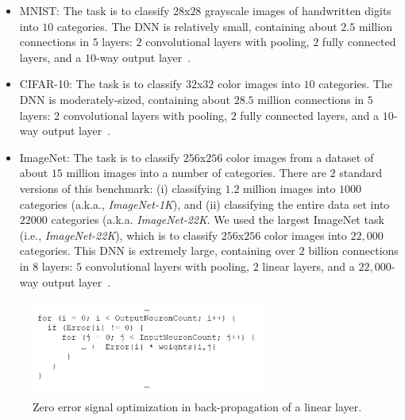 \begin{itemize}
\item MNIST: The task is to classify $28$x$28$ grayscale images of handwritten digits into $10$ categories. The DNN is relatively small, containing about $2.5$ million connections in $5$ layers: $2$ convolutional layers with pooling, $2$ fully connected layers, and a $10$-way output layer~\cite{Chilimbi14}.

\item CIFAR-10: The task is to classify $32$x$32$ color images into $10$ categories.  The DNN is moderately-sized, containing about $28.5$ million connections in $5$  layers: $2$ convolutional layers with pooling, $2$ fully connected layers, and a $10$-way output layer~\cite{Krizhevsky12}.

\item ImageNet:  The task is to classify $256$x$256$ color images from  a dataset of about $15$ million images into a number of categories.  There are $2$ standard versions of this benchmark: (i) classifying $1.2$ million images into $1000$ categories (a.k.a., {\it ImageNet-1K}), and (ii) classifying the entire data set into $22000$ categories (a.k.a. {\it ImageNet-22K}. We used the largest ImageNet task (i.e., {\it ImageNet-22K}), which is to classify $256$x$256$ color images into $22,000$ categories.  This DNN is extremely large, containing over $2$ billion connections in $8$ layers: $5$ convolutional layers with pooling, $2$ linear layers, and a $22,000$-way output layer~\cite{Chilimbi14}. 
\end{itemize}
 
 
 \begin{figure}
 \centering
 \includegraphics[width=3.0in]{Figures/backprop-zero-signal.png}
\caption{Zero error signal optimization in back-propagation of a linear layer.}
 \label{fig:backprop-zero-signal}
 \end{figure}
           
